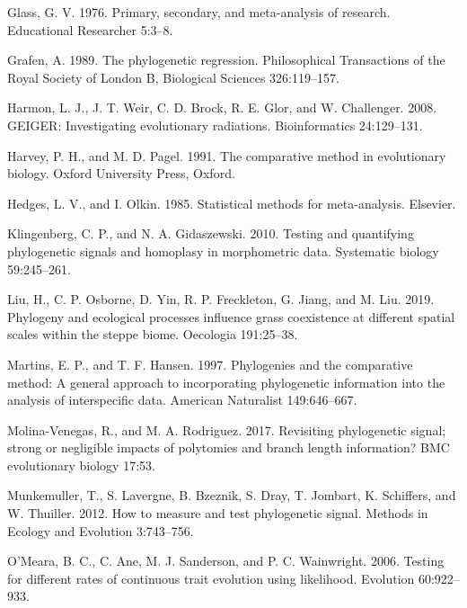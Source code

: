 \documentclass[
]{article}
\begin{document}
\leavevmode\hypertarget{ref-Glass1976}{}%
Glass, G. V. 1976. Primary, secondary, and meta-analysis of research.
Educational Researcher 5:3--8.

\leavevmode\hypertarget{ref-Grafen1989}{}%
Grafen, A. 1989. The phylogenetic regression. Philosophical Transactions
of the Royal Society of London B, Biological Sciences 326:119--157.

\leavevmode\hypertarget{ref-Harmon2008}{}%
Harmon, L. J., J. T. Weir, C. D. Brock, R. E. Glor, and W. Challenger.
2008. GEIGER: Investigating evolutionary radiations. Bioinformatics
24:129--131.

\leavevmode\hypertarget{ref-HarveyPagel1991}{}%
Harvey, P. H., and M. D. Pagel. 1991. The comparative method in
evolutionary biology. Oxford University Press, Oxford.

\leavevmode\hypertarget{ref-HedgesOlkin1985}{}%
Hedges, L. V., and I. Olkin. 1985. Statistical methods for
meta-analysis. Elsevier.

\leavevmode\hypertarget{ref-Klingenberg2010}{}%
Klingenberg, C. P., and N. A. Gidaszewski. 2010. Testing and quantifying
phylogenetic signals and homoplasy in morphometric data. Systematic
biology 59:245--261.

\leavevmode\hypertarget{ref-Liu2019}{}%
Liu, H., C. P. Osborne, D. Yin, R. P. Freckleton, G. Jiang, and M. Liu.
2019. Phylogeny and ecological processes influence grass coexistence at
different spatial scales within the steppe biome. Oecologia 191:25--38.

\leavevmode\hypertarget{ref-MartinsHansen1997}{}%
Martins, E. P., and T. F. Hansen. 1997. Phylogenies and the comparative
method: A general approach to incorporating phylogenetic information
into the analysis of interspecific data. American Naturalist
149:646--667.

\leavevmode\hypertarget{ref-MolinaVenegas2017}{}%
Molina-Venegas, R., and M. A. Rodriguez. 2017. Revisiting phylogenetic
signal; strong or negligible impacts of polytomies and branch length
information? BMC evolutionary biology 17:53.

\leavevmode\hypertarget{ref-Munkemuller_et_al2012}{}%
Munkemuller, T., S. Lavergne, B. Bzeznik, S. Dray, T. Jombart, K.
Schiffers, and W. Thuiller. 2012. How to measure and test phylogenetic
signal. Methods in Ecology and Evolution 3:743--756.

\leavevmode\hypertarget{ref-OMeara_et_al2006}{}%
O'Meara, B. C., C. Ane, M. J. Sanderson, and P. C. Wainwright. 2006.
Testing for different rates of continuous trait evolution using
likelihood. Evolution 60:922--933.
\end{document}

